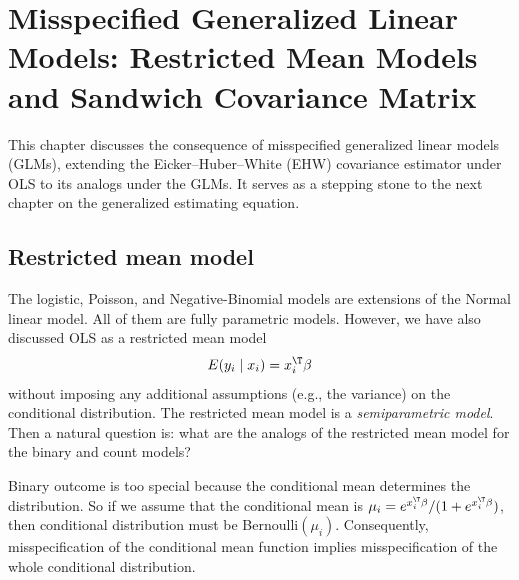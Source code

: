  
\chapter{Misspecified Generalized Linear Models: Restricted Mean Models and Sandwich Covariance Matrix}\label{chapter::sandwich}


This chapter discusses the consequence of misspecified generalized linear models (GLMs), extending the Eicker--Huber--White (EHW) covariance estimator under OLS to its analogs under the GLMs. It serves as a stepping stone to the next chapter on the generalized estimating equation. 



 


\section{Restricted mean model}
\label{sec::rmm-estimation-equation}

The logistic, Poisson, and Negative-Binomial models are extensions of
the Normal linear model. All of them are fully parametric models.
However, we have also discussed OLS as a restricted mean model
\[
E(y_{i}\mid x_{i})=x_{i}^{\T}\beta
\]
without imposing any additional assumptions (e.g., the variance) on
the conditional distribution. The restricted
mean model is a {\it semiparametric model}. Then a natural question is: what
are the analogs of the restricted mean model for the binary and count models? 

Binary outcome is too special because the conditional mean determines
the distribution. So if we assume that the conditional mean is $\mu_{i}=e^{x_{i}^{\T}\beta}/(1+e^{x_{i}^{\T}\beta})$,
then conditional distribution must be Bernoulli$(\mu_{i})$. Consequently, misspecification of the conditional mean function implies misspecification of the whole conditional distribution. 

